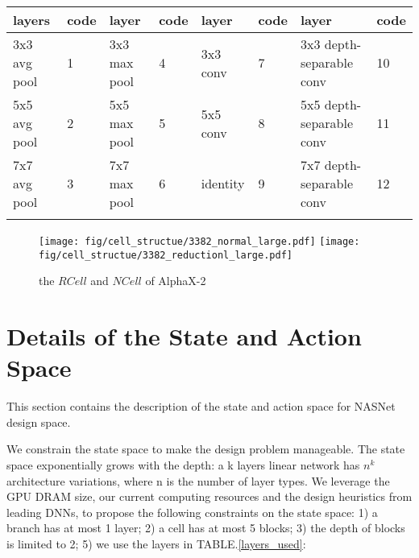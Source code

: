 \documentclass[10pt,twocolumn,letterpaper]{article}
\begin{document}
\newpage








\begin{table*}[t]
  \small
  \caption{The code of different types of layers}
  \label{app:layers_used}
  \centering
  \begin{tabular}{ l l l l l l l l}
    \toprule
          layers & code & layer & code & layer & code & layer & code \\
    \midrule
    	  3x3 avg pool & 1 & 3x3 max pool & 4 & 3x3 conv & 7 & 3x3 depth-separable conv & 10  \\
    	  5x5 avg pool & 2 & 5x5 max pool & 5 & 5x5 conv & 8 & 5x5 depth-separable conv & 11  \\
    	  7x7 avg pool & 3 & 7x7 max pool & 6 & identity & 9 & 7x7 depth-separable conv & 12  \\
    \bottomrule
    \label{layers_used}
  \end{tabular}
\vspace{-0.3in}
\end{table*}

\label{ap:arch}

\begin{figure}
  \begin{center}
    \texttt{[image: fig/cell\_structue/3382\_normal\_large.pdf]}
    \texttt{[image: fig/cell\_structue/3382\_reductionl\_large.pdf]}
  \end{center}
  \caption{the $RCell$ and $NCell$ of AlphaX-2}
  \label{ap:3382}
\end{figure}


\section{Details of the State and Action Space}
\label{ap:state_space}

This section contains the description of the state and action space for NASNet design space.

We constrain the state space to make the design problem manageable. The state space exponentially grows with the depth: a k layers linear network has $n^{k}$ architecture variations, where n is the number of layer types. We leverage the GPU DRAM size, our current computing resources and the design heuristics from leading DNNs, to propose the following constraints on the state space: 1) a branch has at most 1 layer; 2) a cell has at most 5 blocks; 3) the depth of blocks is limited to 2; 5) we use the layers in TABLE.\ref{layers_used}:
\end{document}
